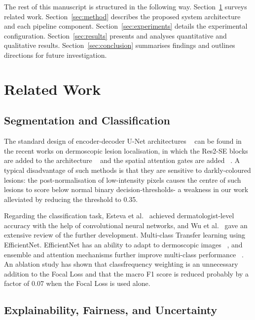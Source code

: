 \documentclass[conference]{IEEEtran}
\begin{document}
The rest of this manuscript is structured in the following way.
Section~\ref{sec:related} surveys related work. Section~\ref{sec:method} describes the proposed system architecture and each pipeline component. Section~\ref{sec:experiments} details the experimental configuration. Section~\ref{sec:results} presents and analyses quantitative and qualitative results. Section~\ref{sec:conclusion} summarises findings and outlines directions for future investigation.

\section{Related Work}
\label{sec:related}

\subsection{Segmentation and Classification}

The standard design of encoder-decoder U-Net architectures ~\cite{seeja2019svm, manzoor2025dualstage} can be found in the recent works on dermoscopic lesion localisation, in which the Res2-SE blocks are added to the architecture ~\cite{liu2025mrpunet} and the spatial attention gates are added ~\cite{pham2023attentionunet}. A typical disadvantage of such methods is that they are sensitive to darkly-coloured lesions: the post-normalisation of low-intensity pixels causes the centre of such lesions to score below normal binary decision-thresholds- a weakness in our work alleviated by reducing the threshold to 0.35.

Regarding the classification task, Esteva et al.~\cite{esteva2017dermatologist} achieved dermatologist-level accuracy with the help of convolutional neural networks, and Wu et al.~\cite{wu2022systematic} gave an extensive review of the further development. Multi-class Transfer learning using EfficientNet. EfficientNet has an ability to adapt to dermoscopic images ~\cite{kanchana2024efficientnet}, and ensemble and attention mechanisms further improve multi-class performance ~\cite{alruwaili2025efficientfusion, tahir2023dsccnet}. An ablation study has shown that classfrequency weighting is an unnecessary addition to the Focal Loss\cite{lin2017focal} and that the macro F1 score is reduced probably by a factor of 0.07 when the Focal Loss is used alone.

\subsection{Explainability, Fairness, and Uncertainty}
\end{document}

